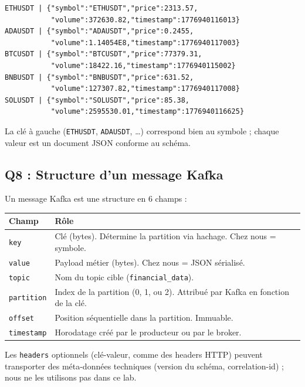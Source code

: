 \documentclass{RapportINPTCLOUD}
\begin{document}
\begin{lstlisting}[style=code]
ETHUSDT | {"symbol":"ETHUSDT","price":2313.57,
           "volume":372630.82,"timestamp":1776940116013}
ADAUSDT | {"symbol":"ADAUSDT","price":0.2455,
           "volume":1.14054E8,"timestamp":1776940117003}
BTCUSDT | {"symbol":"BTCUSDT","price":77379.31,
           "volume":18422.16,"timestamp":1776940115002}
BNBUSDT | {"symbol":"BNBUSDT","price":631.52,
           "volume":127307.82,"timestamp":1776940117008}
SOLUSDT | {"symbol":"SOLUSDT","price":85.38,
           "volume":2595530.01,"timestamp":1776940116625}
\end{lstlisting}

La cl\'{e} \`{a} gauche (\texttt{ETHUSDT}, \texttt{ADAUSDT}, \ldots) correspond bien au symbole ; chaque valeur est un document JSON conforme au sch\'{e}ma.

\subsection{Q8 : Structure d'un message Kafka}

Un message Kafka est une structure en 6 champs :

\begin{center}
\begin{tabular}{|l|p{8.3cm}|}
\hline
\textbf{Champ} & \textbf{R\^{o}le} \\
\hline
\texttt{key} & Cl\'{e} (bytes). D\'{e}termine la partition via hachage. Chez nous = symbole. \\
\texttt{value} & Payload m\'{e}tier (bytes). Chez nous = JSON s\'{e}rialis\'{e}. \\
\texttt{topic} & Nom du topic cible (\texttt{financial\_data}). \\
\texttt{partition} & Index de la partition (0, 1, ou 2). Attribu\'{e} par Kafka en fonction de la cl\'{e}. \\
\texttt{offset} & Position s\'{e}quentielle dans la partition. Immuable. \\
\texttt{timestamp} & Horodatage cr\'{e}\'{e} par le producteur ou par le broker. \\
\hline
\end{tabular}
\end{center}

Les \texttt{headers} optionnels (cl\'{e}-valeur, comme des headers HTTP) peuvent transporter des m\'{e}ta-donn\'{e}es techniques (version du sch\'{e}ma, correlation-id) ; nous ne les utilisons pas dans ce lab.
\end{document}
